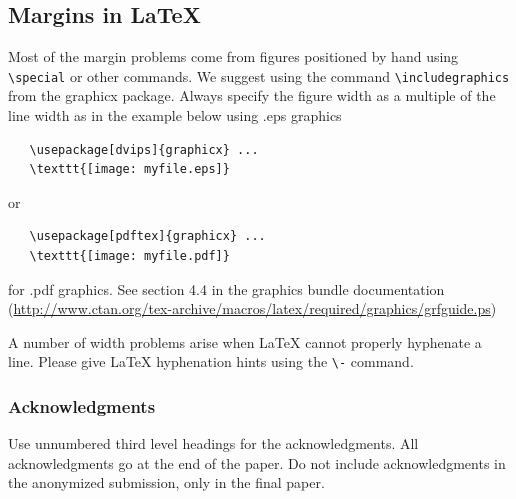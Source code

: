 \documentclass{article} %
\begin{document}
\subsection{Margins in LaTeX}
 
Most of the margin problems come from figures positioned by hand using
\verb+\special+ or other commands. We suggest using the command
\verb+\includegraphics+
from the graphicx package. Always specify the figure width as a multiple of
the line width as in the example below using .eps graphics
\begin{verbatim}
   \usepackage[dvips]{graphicx} ... 
   \texttt{[image: myfile.eps]} 
\end{verbatim}
or %
\begin{verbatim}
   \usepackage[pdftex]{graphicx} ... 
   \texttt{[image: myfile.pdf]} 
\end{verbatim}
for .pdf graphics. 
See section 4.4 in the graphics bundle documentation (\url{http://www.ctan.org/tex-archive/macros/latex/required/graphics/grfguide.ps}) 
 
A number of width problems arise when LaTeX cannot properly hyphenate a
line. Please give LaTeX hyphenation hints using the \verb+\-+ command.


\subsubsection*{Acknowledgments}

Use unnumbered third level headings for the acknowledgments. All
acknowledgments go at the end of the paper. Do not include 
acknowledgments in the anonymized submission, only in the 
final paper. 

\fi 

\end{document}
